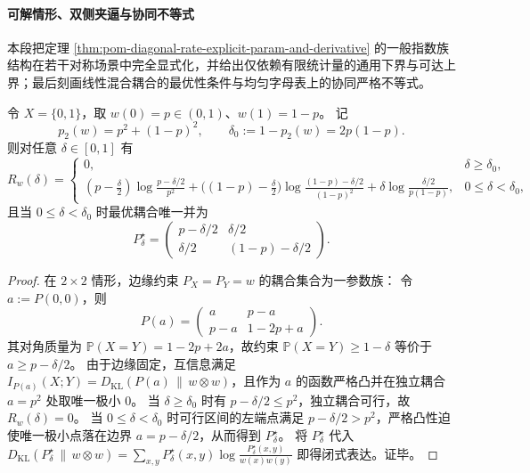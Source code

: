 
\paragraph{可解情形、双侧夹逼与协同不等式}
本段把定理 \ref{thm:pom-diagonal-rate-explicit-param-and-derivative} 的一般指数族结构在若干对称场景中完全显式化，并给出仅依赖有限统计量的通用下界与可达上界；最后刻画线性混合耦合的最优性条件与均匀字母表上的协同严格不等式。

\begin{theorem}[二点字母表的闭式与唯一最优耦合]\label{thm:pom-diagonal-rate-binary-closed-form}
令 \(X=\{0,1\}\)，取 \(w(0)=p\in(0,1)\)、\(w(1)=1-p\)。
记
\[
p_2(w)=p^2+(1-p)^2,\qquad \delta_0:=1-p_2(w)=2p(1-p).
\]
则对任意 \(\delta\in[0,1]\) 有
\[
R_w(\delta)=
\begin{cases}
0, & \delta\ge \delta_0,\\[4pt]
\displaystyle (p-\tfrac{\delta}{2})\log\frac{p-\delta/2}{p^2}
+\bigl((1-p)-\tfrac{\delta}{2}\bigr)\log\frac{(1-p)-\delta/2}{(1-p)^2}
+\delta\log\frac{\delta/2}{p(1-p)}, & 0\le \delta<\delta_0,
\end{cases}
\]
且当 \(0\le\delta<\delta_0\) 时最优耦合唯一并为
\[
P^\star_\delta=
\begin{pmatrix}
p-\delta/2 & \delta/2\\
\delta/2 & (1-p)-\delta/2
\end{pmatrix}.
\]
\end{theorem}
\begin{proof}
在 \(2\times 2\) 情形，边缘约束 \(P_X=P_Y=w\) 的耦合集合为一参数族：
令 \(a:=P(0,0)\)，则
\[
P(a)=
\begin{pmatrix}
a & p-a\\
p-a & 1-2p+a
\end{pmatrix}.
\]
其对角质量为 \(\mathbb P(X=Y)=1-2p+2a\)，故约束 \(\mathbb P(X=Y)\ge 1-\delta\) 等价于 \(a\ge p-\delta/2\)。
由于边缘固定，互信息满足 \(I_{P(a)}(X;Y)=D_{\mathrm{KL}}(P(a)\,\|\,w\otimes w)\)，且作为 \(a\) 的函数严格凸并在独立耦合 \(a=p^2\) 处取唯一极小 \(0\)。
当 \(\delta\ge \delta_0\) 时有 \(p-\delta/2\le p^2\)，独立耦合可行，故 \(R_w(\delta)=0\)。
当 \(0\le \delta<\delta_0\) 时可行区间的左端点满足 \(p-\delta/2>p^2\)，严格凸性迫使唯一极小点落在边界 \(a=p-\delta/2\)，从而得到 \(P^\star_\delta\)。
将 \(P^\star_\delta\) 代入 \(D_{\mathrm{KL}}(P^\star_\delta\,\|\,w\otimes w)=\sum_{x,y}P^\star_\delta(x,y)\log\frac{P^\star_\delta(x,y)}{w(x)w(y)}\) 即得闭式表达。证毕。
\end{proof}

